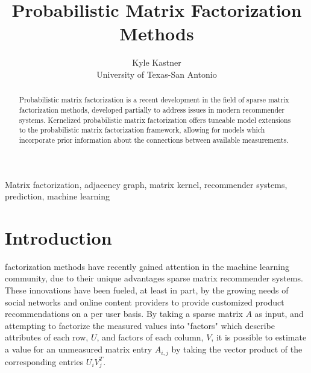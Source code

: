 \documentclass[journal]{IEEEtran}
\begin{document}
\title{Probabilistic Matrix Factorization Methods}

\author{Kyle Kastner\\University of Texas-San Antonio}

\maketitle

\begin{abstract}
Probabilistic matrix factorization is a recent development in the field of sparse matrix factorization methods, developed partially to address issues
in modern recommender systems. Kernelized probabilistic matrix factorization offers tuneable model extensions to the probabilistic matrix
factorization framework, allowing for models which incorporate prior information about the connections between available measurements.
\end{abstract}

\begin{IEEEkeywords}
Matrix factorization, adjacency graph, matrix kernel, recommender systems, prediction, machine learning 
\end{IEEEkeywords}

\IEEEpeerreviewmaketitle
\section{Introduction}
 factorization methods have recently gained attention in the machine learning community, due to their unique advantages sparse 
matrix recommender systems. These innovations have been fueled, at least in part, by the growing needs of social networks and online content providers to
provide customized product recommendations on a per user basis. By taking a sparse matrix \begin{math}A\end{math} as input, and attempting to 
factorize the measured values into "factors" which describe attributes of each row, \begin{math}U\end{math}, and factors of each 
column, \begin{math}V\end{math}, it is possible to estimate a value for an 
unmeasured matrix entry \begin{math}A_{i,j}\end{math} by taking the vector product of the corresponding entries \begin{math} U_i V_j^T
\end{math}. 
\end{document}
